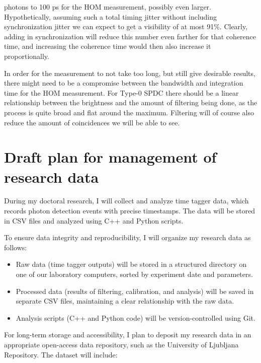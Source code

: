 \documentclass{article}
\begin{document}
photons to 100 ps for the HOM measurement, possibly even larger.
Hypothetically, assuming such a total timing jitter without including
synchronization jitter we can expect to get a visibility of at most 91\%.
Clearly, adding in synchronization will reduce this number even farther for
that coherence time, and increasing the coherence time would then also increase
it proportionally. \par In order for the measurement to not take too long, but
still give desirable results, there might need to be a compromise between the
bandwidth and integration time for the HOM measurement. For Type-0 SPDC there
should be a linear relationship between the brightness and the amount of
filtering being done, as the process is quite broad and flat around the
maximum. Filtering will of course also reduce the amount of coincidences we
will be able to see.


\section{Draft plan for management of research data} During my doctoral
research, I will collect and analyze time tagger data, which records photon
detection events with precise timestamps. The data will be stored in CSV files
and analyzed using C++ and Python scripts.

To ensure data integrity and reproducibility, I will organize my research data
as follows: \begin{itemize} \item Raw data (time tagger outputs) will be stored
	      in a structured directory on one of our laboratory computers, sorted by
	      experiment date and parameters. \item Processed data (results of filtering,
	      calibration, and analysis) will be saved in separate CSV files, maintaining a
	      clear relationship with the raw data. \item Analysis scripts (C++ and Python
	      code) will be version-controlled using Git. \end{itemize} For long-term
storage and accessibility, I plan to deposit my research data in an
appropriate open-access data repository, such as the University of Ljubljana
Repository. The dataset will include:
\end{document}
